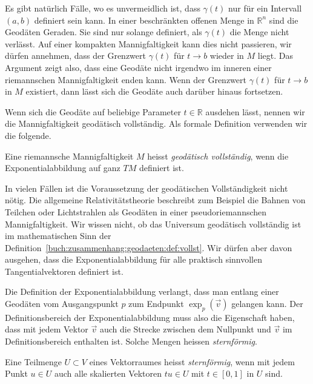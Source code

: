 Es gibt natürlich Fälle, wo es unvermeidlich ist, dass $\gamma(t)$
nur für ein Intervall $(a,b)$ definiert sein kann.
In einer beschränkten offenen Menge in $\mathbb{R}^n$ sind die Geodäten
Geraden.
Sie sind nur solange definiert, als $\gamma(t)$ die Menge
nicht verlässt.
Auf einer kompakten Mannigfaltigkeit kann dies nicht passieren,
wir dürfen annehmen, dass der Grenzwert $\gamma(t)$ für $t\to b$
wieder in $M$ liegt.
Das Argument zeigt also, dass eine Geodäte nicht irgendwo im inneren
einer riemannschen Mannigfaltigkeit enden kann.
Wenn der Grenzwert $\gamma(t)$ für $t\to b$ in $M$ existiert, dann
lässt sich die Geodäte auch darüber hinaus fortsetzen.

Wenn sich die Geodäte auf beliebige Parameter $t\in\mathbb{R}$
ausdehen lässt, nennen wir die Mannigfaltigkeit geodätisch vollständig.
Als formale Definition verwenden wir die folgende.

\begin{definition}
\label{buch:zusammenhang:geodaeten:def:vollst}
Eine riemannsche Mannigfaltigkeit $M$ heisst \emph{geodätisch vollständig},
wenn die Exponentialabbildung auf ganz $TM$ definiert ist.
%
\end{definition}

In vielen Fällen ist die Voraussetzung der geodätischen Vollständigkeit
nicht nötig.
Die allgemeine Relativitätstheorie beschreibt zum Beispiel die Bahnen
von Teilchen oder Lichtstrahlen als Geodäten in einer pseudoriemannschen
Mannigfaltigkeit.
%
Wir wissen nicht, ob das Universum geodätisch vollständig ist im
mathematischen Sinn der
Definition~\ref{buch:zusammenhang:geodaeten:def:vollst}.
Wir dürfen aber davon ausgehen, dass die Exponentialabbildung für alle
praktisch sinnvollen Tangentialvektoren definiert ist.

Die Definition der Exponentialabbildung verlangt, dass man entlang einer
Geodäten vom Ausgangspunkt $p$ zum Endpunkt $\exp_p(\vec{v})$ gelangen
kann.
Der Definitionsbereich der Exponentialabbildung muss also die Eigenschaft
haben, dass mit jedem Vektor $\vec{v}$ auch die Strecke zwischen dem Nullpunkt
und $\vec{v}$ im Definitionsbereich enthalten ist.
Solche Mengen heissen \emph{sternförmig}.

\begin{definition}[sternförmig]
\label{buch:zusammenhang:geodaeten:def:sternfoermig}
Eine Teilmenge $U\subset V$ eines Vektorraumes heisst \emph{sternförmig},
wenn mit jedem Punkt $u\in U$ auch alle skalierten Vektoren $tu\in U$
mit $t\in [0,1]$ in $U$ sind.
%
\end{definition}

